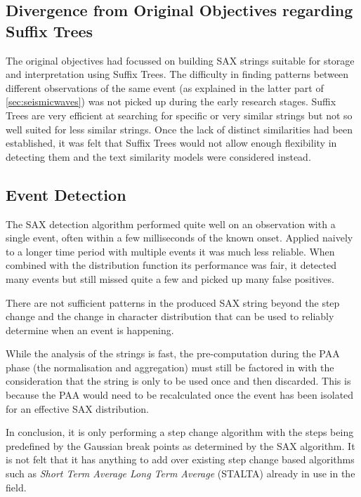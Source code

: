 \documentclass[../report.tex]{subfiles}
\begin{document}
		
\subsection{Divergence from Original Objectives regarding Suffix Trees} \label{sec:alteration-objectives}
	
	The original objectives had focussed on building SAX strings suitable for storage and interpretation using Suffix Trees.  The difficulty in finding patterns between different observations of the same event (as explained in the latter part of \cref{sec:seismicwaves}) was not picked up during the early research stages.  Suffix Trees are very efficient at searching for specific or very similar strings but not so well suited for less similar strings.  Once the lack of distinct similarities had been established, it was felt that Suffix Trees would not allow enough flexibility in detecting them and the text similarity models were considered instead.

\subsection{Event Detection}

	The SAX detection algorithm performed quite well on an observation with a single event, often within a few milliseconds of the known onset.  Applied naively to a longer time period with multiple events it was much less reliable.  When combined with the distribution function its performance was fair, it detected many events but still missed quite a few and picked up many false positives.
	
	There are not sufficient patterns in the produced SAX string beyond the step change and the change in character distribution that can be used to reliably determine when an event is happening.
	
	While the analysis of the strings is fast, the pre-computation during the PAA phase (the normalisation and aggregation) must still be factored in with the consideration that the string is only to be used once and then discarded.  This is because the PAA would need to be recalculated once the event has been isolated for an effective SAX distribution.
	
	In conclusion, it is only performing a step change algorithm with the steps being predefined by the Gaussian break points as determined by the SAX algorithm.  It is not felt that it has anything to add over existing step change based algorithms such as \textit{Short Term Average Long Term Average} (STALTA) already in use in the field.
\end{document}
